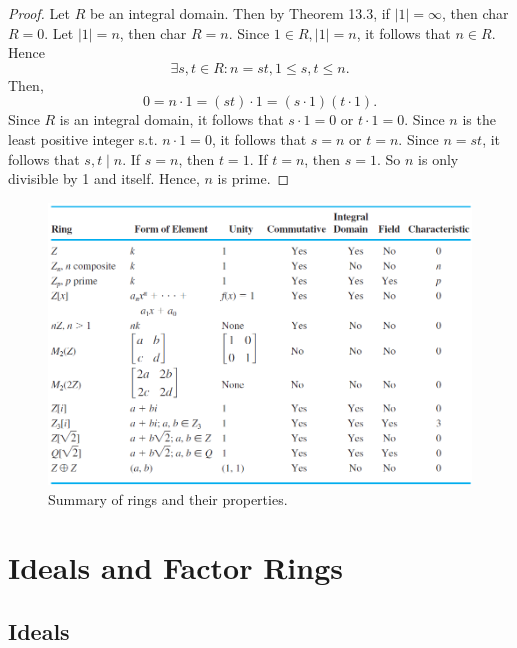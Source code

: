 \documentclass{article}
\theoremstyle{definition}
\newtheorem{definition}{Definition}[section]
\begin{document}
\begin{proof}
     Let $R$ be an integral domain. Then by Theorem 13.3, if $|1|=\infty$, then char $R=0$. Let $|1|=n$, then char $R=n$. Since $1\in R, |1|=n$, it follows that $n\in R$. Hence 
     \begin{equation*}
         \exists s,t \in R: n=st, 1\leq s,t \leq n.
     \end{equation*}
     Then,
     \begin{equation*}
         0=n\cdot1=(st)\cdot1=(s\cdot1)(t\cdot1).
     \end{equation*}
     Since $R$ is an integral domain, it follows that $s\cdot1=0$ or $t\cdot1=0$. Since $n$ is the least positive integer s.t. $n\cdot1=0$, it follows that $s=n$ or $t=n$. Since $n=st$, it follows that $s,t\mid n$. If $s=n$, then $t=1$. If $t=n$, then $s=1$. So $n$ is only divisible by 1 and itself. Hence, $n$ is prime.
\end{proof}

\begin{figure}[!htbp]
    \centering
    \includegraphics[width=\linewidth]{figures/ring-summary.png}
    \caption{Summary of rings and their properties.}
    \label{ring-summary}
\end{figure}

\section{Ideals and Factor Rings}
\subsection{Ideals}
\end{document}
